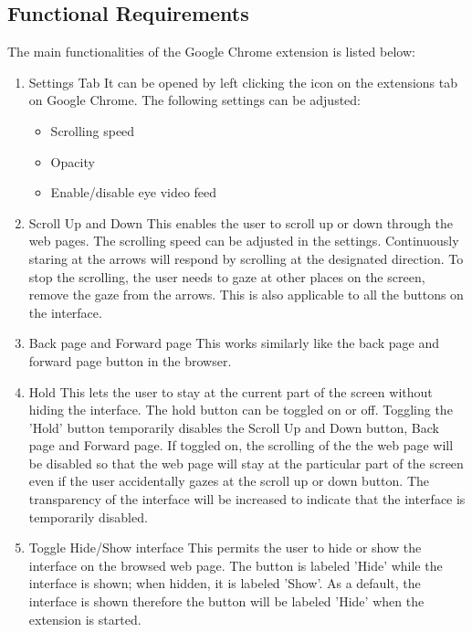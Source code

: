 \documentclass[journal]{./IEEE/IEEEtran}
\begin{document}
\subsection  {Functional Requirements}
The main functionalities of the Google Chrome extension is listed below:
\begin{enumerate}
\item Settings Tab
\newline
It can be opened by left clicking the icon on the extensions tab on Google Chrome. The following settings can be adjusted: 
\begin{itemize}
\item Scrolling speed
\item Opacity 
\item Enable/disable eye video feed
\end{itemize}



\item Scroll Up and Down
\newline
This enables the user to scroll up or down through the web pages.  The scrolling speed can be adjusted in the settings.  Continuously staring at the  arrows will respond by scrolling at the designated direction. To stop the scrolling, the user needs to gaze at other places on the screen, remove the gaze from the arrows. This is also applicable to all the buttons on the interface. 

\item Back page and Forward page 
\newline
This works similarly like the back page and forward page button in the browser.

\item Hold 
\newline
This lets the user to stay at the current part of the screen without hiding the interface. The hold button can be toggled on or off. Toggling the 'Hold' button  temporarily disables the Scroll Up and Down button, Back page and Forward page. If toggled on, the scrolling of the the web page will be disabled so that the web page will stay at the particular part of the screen even if the user accidentally gazes at the scroll up or down button. The transparency of the interface will be increased to indicate that the interface is temporarily disabled.


\item Toggle Hide/Show interface 
\newline
This permits  the user to hide or show the interface on the browsed web page. 
The button is  labeled 'Hide' while the interface is shown; when hidden, it is labeled 'Show'. As a default, the interface is shown therefore the button will be labeled 'Hide' when the extension is started. 
\end {enumerate}
\end{document}
